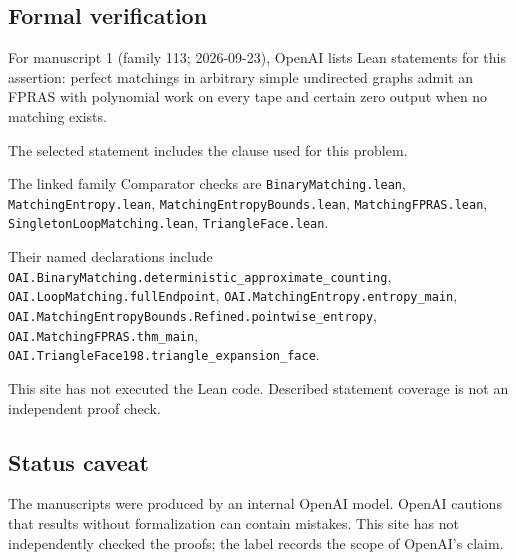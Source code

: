 \documentclass[11pt]{article}
\begin{document}
\subsection{Formal verification}
For manuscript 1 (family 113; 2026-09-23), OpenAI lists Lean statements for this assertion: perfect matchings in arbitrary simple undirected graphs admit an FPRAS with polynomial work on every tape and certain zero output when no matching exists.

The selected statement includes the clause used for this problem.

The linked family Comparator checks are \texttt{BinaryMatching.lean}, \texttt{MatchingEntropy.lean}, \texttt{MatchingEntropyBounds.lean}, \texttt{MatchingFPRAS.lean}, \texttt{SingletonLoopMatching.lean}, \texttt{TriangleFace.lean}.

Their named declarations include \texttt{OAI.BinaryMatching.deterministic\_approximate\_counting}, \texttt{OAI.LoopMatching.fullEndpoint}, \texttt{OAI.MatchingEntropy.entropy\_main}, \texttt{OAI.MatchingEntropyBounds.Refined.pointwise\_entropy}, \texttt{OAI.MatchingFPRAS.thm\_main}, \texttt{OAI.TriangleFace198.triangle\_expansion\_face}.

This site has not executed the Lean code. Described statement coverage is not an independent proof check.

\subsection{Status caveat}
The manuscripts were produced by an internal OpenAI model. OpenAI cautions that results without formalization can contain mistakes. This site has not independently checked the proofs; the label records the scope of OpenAI's claim.
\end{document}
